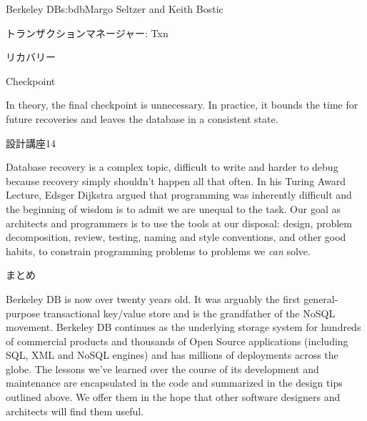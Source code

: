 \begin{aosachapter}{Berkeley DB}{s:bdb}{Margo Seltzer and Keith Bostic}
\begin{aosasect1}{トランザクションマネージャー: Txn}
\begin{aosasect2}{リカバリー}
\begin{aosaenumerate}
  \item Checkpoint

\end{aosaenumerate}

\vspace{-0.2cm}

In theory, the final checkpoint is unnecessary. In practice, it bounds
the time for future recoveries and leaves the database in a consistent
state. 

\begin{aosabox}{設計講座14}

Database recovery is a complex topic, difficult to write and harder to
debug because recovery simply shouldn't happen all that often. In his
Turing Award Lecture, Edsger Dijkstra argued that programming was
inherently difficult and the beginning of wisdom is to admit we are
unequal to the task. Our goal as architects and programmers is to use
the tools at our disposal: design, problem decomposition, review,
testing, naming and style conventions, and other good habits, to
constrain programming problems to problems we \emph{can} solve.

\end{aosabox}

\end{aosasect2}

\end{aosasect1}
\newpage
\begin{aosasect1}{まとめ}

Berkeley DB is now over twenty years old. It was arguably the first
general-purpose transactional key/value store and is the grandfather
of the NoSQL movement. Berkeley DB continues as the underlying storage
system for hundreds of commercial products and thousands of Open
Source applications (including SQL, XML and NoSQL engines) and has
millions of deployments across the globe. The lessons we've learned
over the course of its development and maintenance are encapsulated in
the code and summarized in the design tips outlined above. We offer
them in the hope that other software designers and architects will
find them useful.

\end{aosasect1}

\end{aosachapter}
